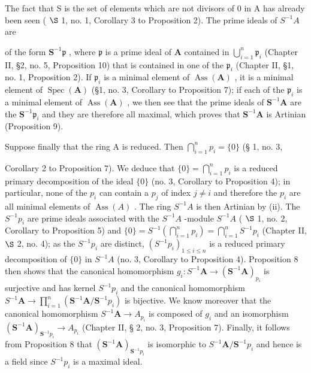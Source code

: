 The fact that S is the set of elements which are not divisors of 0 in A has already been seen ( \(\S\) 1, no. 1, Corollary 3 to Proposition 2). The prime ideals of \(S^{-1}A\) are

of the form \(\mathbf{S}^{-1}\mathfrak{p}\) , where \(\mathfrak{p}\) is a prime ideal of \(\mathbf{A}\) contained in \(\bigcup_{i=1}^{n} \mathfrak{p}_i\) (Chapter II, §2, no. 5, Proposition 10) that is contained in one of the \(\mathfrak{p}_i\) (Chapter II, §1, no. 1, Proposition 2). If \(\mathfrak{p}_i\) is a minimal element of \(\operatorname{Ass}(\mathbf{A})\) , it is a minimal element of \(\operatorname{Spec}(\mathbf{A})\) (§1, no. 3, Corollary to Proposition 7); if each of the \(\mathfrak{p}_i\) is a minimal element of \(\operatorname{Ass}(\mathbf{A})\) , we then see that the prime ideals of \(\mathbf{S}^{-1}\mathbf{A}\) are the \(\mathbf{S}^{-1}\mathfrak{p}_i\) and they are therefore all maximal, which proves that \(\mathbf{S}^{-1}\mathbf{A}\) is Artinian (Proposition 9).

Suppose finally that the ring A is reduced. Then \(\bigcap_{i=1}^{n} p_i = \{0\}\) (§ 1, no. 3,

Corollary 2 to Proposition 7). We deduce that \(\{0\} = \bigcap_{i=1}^{n} p_i\) is a reduced primary decomposition of the ideal \(\{0\}\) (no. 3, Corollary to Proposition 4); in particular, none of the \(p_i\) can contain a \(p_j\) of index \(j \neq i\) and therefore the \(p_i\) are all minimal elements of \(\operatorname{Ass}(A)\) . The ring \(S^{-1}A\) is then Artinian by (ii). The \(S^{-1}p_i\) are prime ideals associated with the \(S^{-1}A\) -module \(S^{-1}A\) ( \(\S\) 1, no. 2, Corollary to Proposition 5) and \(\{0\} = S^{-1}\left(\bigcap_{i=1}^{n} p_i\right) = \bigcap_{i=1}^{n} S^{-1}p_i\) (Chapter II, \(\S\) 2, no. 4); as the \(S^{-1}p_i\) are distinct, \((S^{-1}p_i)_{1 \leqslant i \leqslant n}\) is a reduced primary decomposition of \(\{0\}\) in \(S^{-1}A\) (no. 3, Corollary to Proposition 4). Proposition 8 then shows that the canonical homomorphism \(g_{i} \colon S^{-1}\mathbf{A} \to (\mathbf{S}^{-1}\mathbf{A})_{p_{i}}\) is surjective and has kernel \(S^{-1}p_{i}\) and the canonical homomorphism \(S^{-1}\mathbf{A} \to \prod_{i=1}^{n} (\mathbf{S}^{-1}\mathbf{A}/\mathbf{S}^{-1}p_{i})\) is bijective. We know moreover that the canonical homomorphism \(S^{-1}\mathbf{A} \to A_{p_{i}}\) is composed of \(g_{i}\) and an isomorphism \((\mathbf{S}^{-1}\mathbf{A})_{\mathbf{S}^{-1}p_{i}} \to A_{p_{i}}\) (Chapter II, § 2, no. 3, Proposition 7). Finally, it follows from Proposition 8 that \((\mathbf{S}^{-1}\mathbf{A})_{\mathbf{S}^{-1}p_{i}}\) is isomorphic to \(S^{-1}\mathbf{A}/\mathbf{S}^{-1}p_{i}\) and hence is a field since \(S^{-1}p_{i}\) is a maximal ideal.

